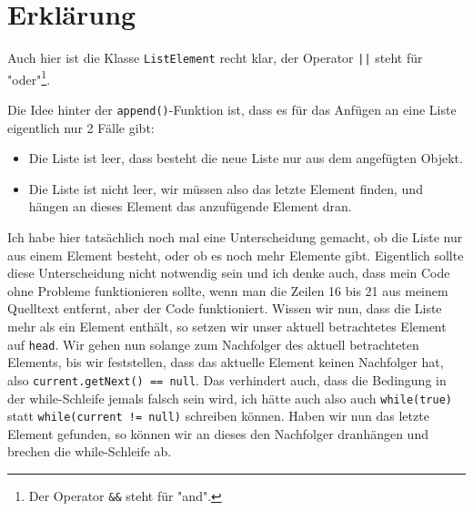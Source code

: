 \documentclass{article}
\begin{document}
	\section*{Erklärung}
	Auch hier ist die Klasse \texttt{ListElement} recht klar, der Operator \texttt{||} steht für "oder"\footnote{Der Operator \texttt{\&\&} steht für "and".}.
	
	Die Idee hinter der \texttt{append()}-Funktion ist, dass es für das Anfügen an eine Liste eigentlich nur 2 Fälle gibt:
	\begin{itemize}
		\item Die Liste ist leer, dass besteht die neue Liste nur aus dem angefügten Objekt.
		\item Die Liste ist nicht leer, wir müssen also das letzte Element finden, und hängen an dieses Element das anzufügende Element dran.
	\end{itemize}
	Ich habe hier tatsächlich noch mal eine Unterscheidung gemacht, ob die Liste nur aus einem Element besteht, oder ob es noch mehr Elemente gibt. Eigentlich sollte diese Unterscheidung nicht notwendig sein und ich denke auch, dass mein Code ohne Probleme funktionieren sollte, wenn man die Zeilen 16 bis 21 aus meinem Quelltext entfernt, aber der Code funktioniert. Wissen wir nun, dass die Liste mehr als ein Element enthält, so setzen wir unser aktuell betrachtetes Element auf \texttt{head}. Wir gehen nun solange zum Nachfolger des aktuell betrachteten Elements, bis wir feststellen, dass das aktuelle Element keinen Nachfolger hat, also \texttt{current.getNext() == null}. Das verhindert auch, dass die Bedingung in der while-Schleife jemals falsch sein wird, ich hätte auch also auch \texttt{while(true)} statt \texttt{while(current != null)} schreiben können. Haben wir nun das letzte Element gefunden, so können wir an dieses den Nachfolger dranhängen und brechen die while-Schleife ab.
	
\end{document}
